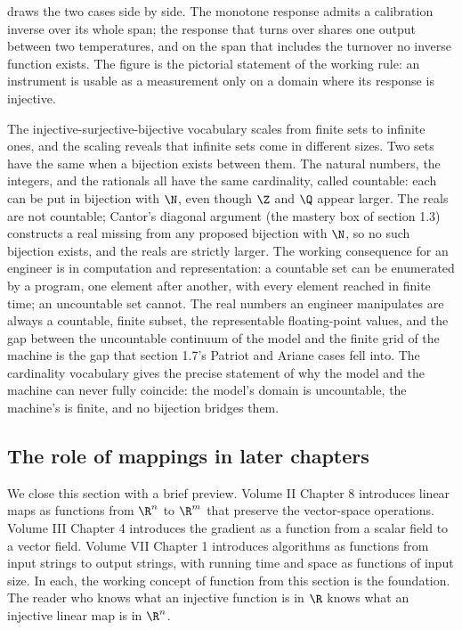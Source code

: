 

 draws the two cases side by
side. The monotone response admits a calibration inverse over its whole
span; the response that turns over shares one output between two
temperatures, and on the span that includes the turnover no inverse
function exists. The figure is the pictorial statement of the working
rule: an instrument is usable as a measurement only on a domain where its
response is injective.

\begin{mastery}
The injective-surjective-bijective vocabulary scales from finite sets
to infinite ones, and the scaling reveals that infinite sets come in
different sizes. Two sets have the same  when a
bijection exists between them. The natural numbers, the integers, and
the rationals all have the same cardinality, called countable: each can
be put in bijection with $\N$, even though $\Z$ and $\Q$ appear larger.
The reals are not countable; Cantor's diagonal argument (the mastery
box of section 1.3) constructs a real missing from any proposed
bijection with $\N$, so no such bijection exists, and the reals are
strictly larger. The working consequence for an engineer is in
computation and representation: a countable set can be enumerated by a
program, one element after another, with every element reached in
finite time; an uncountable set cannot. The real numbers an engineer
manipulates are always a countable, finite subset, the representable
floating-point values, and the gap between the uncountable continuum of
the model and the finite grid of the machine is the gap that section
1.7's Patriot and Ariane cases fell into. The cardinality vocabulary
gives the precise statement of why the model and the machine can never
fully coincide: the model's domain is uncountable, the machine's is
finite, and no bijection bridges them.
\end{mastery}

\subsection{The role of mappings in later chapters}

We close this section with a brief preview. Volume II Chapter 8
introduces linear maps as functions from $\R^{n}$ to $\R^{m}$ that
preserve the vector-space operations. Volume III Chapter 4
introduces the gradient as a function from a scalar field to a
vector field. Volume VII Chapter 1 introduces algorithms as
functions from input strings to output strings, with running time
and space as functions of input size. In each, the working concept
of function from this section is the foundation. The reader who
knows what an injective function is in $\R$ knows what an injective
linear map is in $\R^{n}$.

